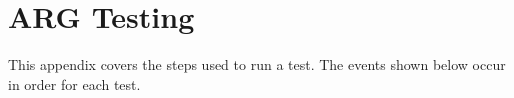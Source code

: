 \chapter{\ac{ARG} Testing}
\label{chp:testseq}
\par This appendix covers the steps used to run a test. The events shown below occur in order for each test. 

\begin{comment}
\section{Network Setup}
\par As Section \ref{sec:evaluation_technique} discusses, tests are run on a seven-node network, laid out as illustrated in Figure \ref{fig:argnetwork_app}.
\begin{figure}
	\centering
	\caption{ARG Network Layout Overview}
	\label{fig:argnetwork_app}
	\texttt{[image: thesis\_network]}
\end{figure}

\section{Test Sequence}
\end{comment}

